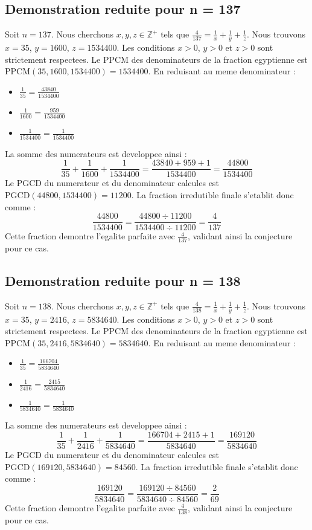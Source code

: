 \documentclass[11pt,a4paper]{article}
\begin{document}
\subsection{Demonstration reduite pour n = 137}
Soit $n = 137$. Nous cherchons $x, y, z \in \mathbb{Z}^{+}$ tels que $\frac{4}{137} = \frac{1}{x} + \frac{1}{y} + \frac{1}{z}$.
Nous trouvons $x = 35$, $y = 1600$, $z = 1534400$.
Les conditions $x > 0$, $y > 0$ et $z > 0$ sont strictement respectees.
Le PPCM des denominateurs de la fraction egyptienne est $\text{PPCM}(35, 1600, 1534400) = 1534400$.
En reduisant au meme denominateur :
\begin{itemize}
    \item $\frac{1}{35} = \frac{43840}{1534400}$
    \item $\frac{1}{1600} = \frac{959}{1534400}$
    \item $\frac{1}{1534400} = \frac{1}{1534400}$
\end{itemize}
La somme des numerateurs est developpee ainsi :
$$ \frac{1}{35} + \frac{1}{1600} + \frac{1}{1534400} = \frac{43840 + 959 + 1}{1534400} = \frac{44800}{1534400} $$
Le PGCD du numerateur et du denominateur calcules est $\text{PGCD}(44800, 1534400) = 11200$.
La fraction irredutible finale s'etablit donc comme :
$$ \frac{44800}{1534400} = \frac{44800 \div 11200}{1534400 \div 11200} = \frac{4}{137} $$
Cette fraction demontre l'egalite parfaite avec $\frac{4}{137}$, validant ainsi la conjecture pour ce cas.

\subsection{Demonstration reduite pour n = 138}
Soit $n = 138$. Nous cherchons $x, y, z \in \mathbb{Z}^{+}$ tels que $\frac{4}{138} = \frac{1}{x} + \frac{1}{y} + \frac{1}{z}$.
Nous trouvons $x = 35$, $y = 2416$, $z = 5834640$.
Les conditions $x > 0$, $y > 0$ et $z > 0$ sont strictement respectees.
Le PPCM des denominateurs de la fraction egyptienne est $\text{PPCM}(35, 2416, 5834640) = 5834640$.
En reduisant au meme denominateur :
\begin{itemize}
    \item $\frac{1}{35} = \frac{166704}{5834640}$
    \item $\frac{1}{2416} = \frac{2415}{5834640}$
    \item $\frac{1}{5834640} = \frac{1}{5834640}$
\end{itemize}
La somme des numerateurs est developpee ainsi :
$$ \frac{1}{35} + \frac{1}{2416} + \frac{1}{5834640} = \frac{166704 + 2415 + 1}{5834640} = \frac{169120}{5834640} $$
Le PGCD du numerateur et du denominateur calcules est $\text{PGCD}(169120, 5834640) = 84560$.
La fraction irredutible finale s'etablit donc comme :
$$ \frac{169120}{5834640} = \frac{169120 \div 84560}{5834640 \div 84560} = \frac{2}{69} $$
Cette fraction demontre l'egalite parfaite avec $\frac{4}{138}$, validant ainsi la conjecture pour ce cas.
\end{document}
